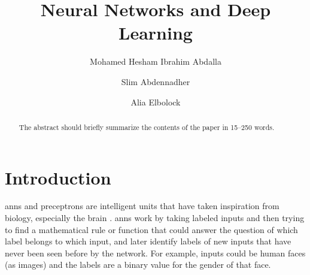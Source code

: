 \documentclass[runningheads]{llncs}
\begin{document}
%
\title{Neural Networks and Deep Learning }
%
%
\author{Mohamed Hesham Ibrahim Abdalla \and
Slim Abdennadher \and
Alia Elbolock}
%
%
%
\maketitle              %
%
\begin{abstract}
The abstract should briefly summarize the contents of the paper in
15--250 words.

\end{abstract}
%
%
%
\section{Introduction}

\gls{anns} and preceptrons are intelligent units that have taken inspiration
from biology, especially the brain \cite{hassoun1995fundamentals}. \gls{anns} work by taking labeled inputs
and then trying to find a mathematical rule or function that could answer the question
of which label belongs to which input, and later identify labels of new inputs that have never been seen before by the network. For example, inputs could be human faces (as images) and the labels are 
a binary value for the gender of that face.
\end{document}
